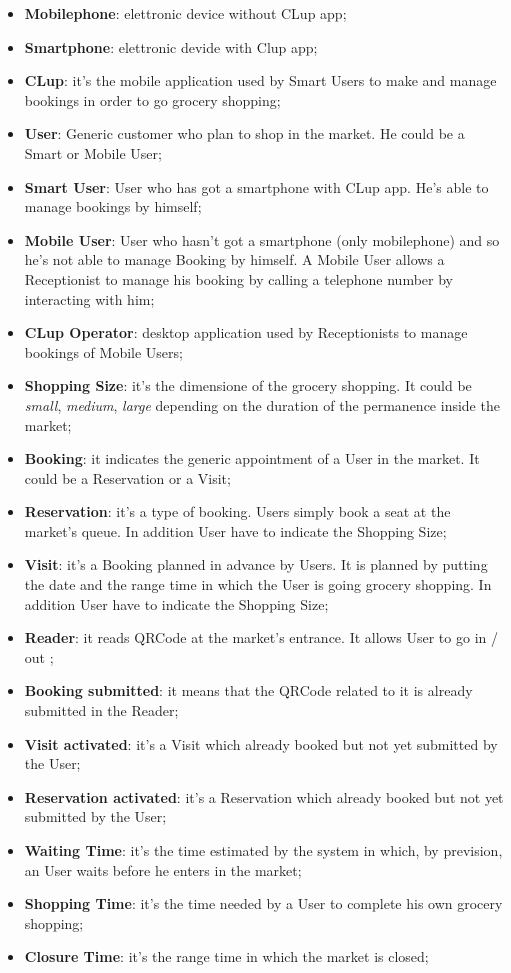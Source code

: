 \begin{itemize}

\item \textbf{Mobilephone}: elettronic device without CLup app;
\item \textbf{Smartphone}: elettronic devide with Clup app; 
\item \textbf{CLup}: it's the mobile application used by Smart Users to make and manage bookings in order to go grocery shopping;
\item \textbf{User}: Generic customer who plan to shop in the market. He could be a Smart or Mobile User;
\item \textbf{Smart User}: User who has got a smartphone with CLup app. He's able to manage bookings by himself;
\item \textbf{Mobile User}: User who hasn't got a smartphone (only mobilephone) and so he's not able to manage Booking by himself. A Mobile User allows a Receptionist to manage his booking by calling a telephone number by interacting with him;
\item \textbf{CLup Operator}: desktop application used by Receptionists to manage bookings of Mobile Users;
\item \textbf{Shopping Size}: it's the dimensione of the grocery shopping. It could be \textit{small}, \textit{medium}, \textit{large} depending on the duration of the permanence inside the market; 
\item \textbf{Booking}: it indicates the generic appointment of a User in the market. It could be a Reservation or a Visit;
\item \textbf{Reservation}: it's a type of booking. Users simply book a seat at the market's queue. In addition User have to indicate the Shopping Size; 
\item \textbf{Visit}: it's a Booking planned in advance by Users. It is planned by putting the date and the range time in which the User is going grocery shopping. In addition User have to indicate the Shopping Size; 
\item \textbf{Reader}: it reads QRCode at the market's entrance. It allows User to go in / out ;
\item \textbf{Booking submitted}: it means that the QRCode related to it is already submitted in the Reader;
\item \textbf{Visit activated}: it's a Visit which already booked but not yet submitted by the User;
\item \textbf{Reservation activated}: it's a Reservation which already booked but not yet submitted by the User;
\item \textbf{Waiting Time}: it's the time estimated by the system in which, by prevision, an User waits before he enters in the market;
\item \textbf{Shopping Time}: it's the time needed by a User to complete his own grocery shopping;
\item \textbf{Closure Time}: it's the range time in which the market is closed;
\end{itemize}


